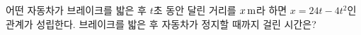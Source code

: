 어떤 자동차가 브레이크를 밟은 후 $t$초 동안 달린 거리를 $x\mkern3mu \mathrm{m}$라 하면 $x=24t-4t^2$인 관계가 성립한다. 브레이크를 밟은 후 자동차가 정지할 때까지 걸린 시간은?
